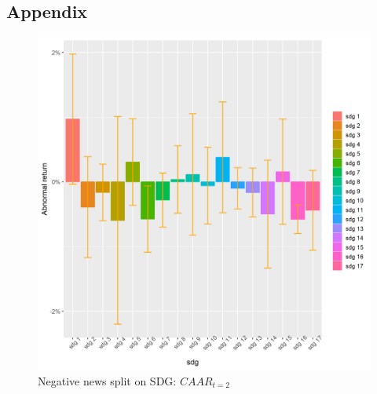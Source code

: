 \subsection{Appendix} \label{app: derivations}
\begin{figure} [H] 
    \centering
    \includegraphics[scale=0.6]{Projekt/1.Figures analysis/ST_negative_sdg_bar_2.png} 
    \caption{Negative news split on SDG: $CAAR_{t=2}$}
    \label{fig:ST_pos_news}
\end{figure}

